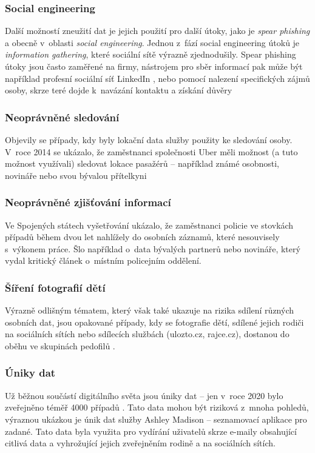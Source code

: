 \subsubsection*{Social engineering}
Další možností zneužití dat je jejich použití pro další útoky, jako je \textit{spear phishing} a obecně v~oblasti \textit{social engineering}. Jednou z~fází social engineering útoků je \textit{information gathering}\citep{social-engineering-definition}, které sociální sítě výrazně zjednodušily. Spear phishing útoky jsou často zaměřené na firmy, nástrojem pro sběr informací pak může být například profesní sociální síť LinkedIn \citep{social-engineering-tools}, nebo pomocí nalezení specifických zájmů osoby, skrze teré dojde k~navázání kontaktu a získání důvěry \citep{social-engineering-book}

\subsubsection*{Neoprávněné sledování}
Objevily se případy, kdy byly lokační data služby použity ke sledování osoby. V~roce 2014 se ukázalo, že zaměstnanci společnosti Uber měli možnost (a tuto možnost využívali) sledovat lokace pasažérů -- například známé osobnosti, novináře nebo svou bývalou přítelkyni\citep{uber-spying}

\subsubsection*{Neoprávněné zjišťování informací}
Ve Spojených státech vyšetřování ukázalo, že zaměstnanci policie ve stovkách případů během dvou let nahlížely do osobních záznamů, které nesouvisely s~výkonem práce. Šlo například o~data bývalých partnerů nebo novináře, který vydal kritický článek o~místním policejním oddělení.\citep{police-spying} 

\subsubsection*{Šíření fotografií dětí}
Výrazně odlišným tématem, který však také ukazuje na rizika sdílení různých osobních dat, jsou opakované případy, kdy se fotografie dětí, sdílené jejich rodiči na sociálních sítích nebo sdílecích službách (ulozto.cz, rajce.cz), dostanou do oběhu ve skupinách pedofilů \citep{pedophiles-web}.

\subsubsection*{Úniky dat}
Už běžnou součástí digitálního světa jsou úniky dat -- jen v~roce 2020 bylo zveřejněno téměř 4000 případů \citep{data-breaches-2021}. Tato data mohou být riziková z~mnoha pohledů, výraznou ukázkou je únik dat služby Ashley Madison -- seznamovací aplikace pro zadané. Tato data byla využita pro vydírání uživatelů skrze e-maily obsahující citlivá data a vyhrožující jejich zveřejněním rodině a na sociálních sítích.\citep{ashley-madison-leak}

